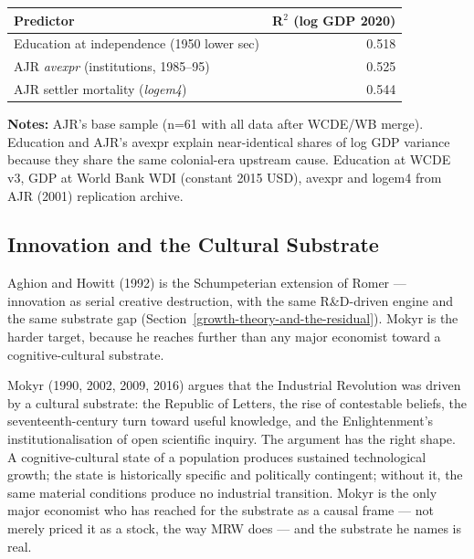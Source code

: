 \documentclass[12pt,letterpaper]{article}
\begin{document}
\begin{longtable}[]{@{}lr@{}}
\toprule
Predictor & R$^2$ (log GDP 2020) \\
\midrule
\endhead
Education at independence (1950 lower sec) & 0.518 \\
AJR \emph{avexpr} (institutions, 1985--95) & 0.525 \\
AJR settler mortality (\emph{logem4}) & 0.544 \\
\bottomrule
\end{longtable}\addtocounter{table}{-1}%

\begin{minipage}{\dimexpr\textwidth-2em}
\scriptsize
\textbf{Notes:} AJR's base sample (n=61 with all data after
WCDE/WB merge). Education and AJR's avexpr explain near-identical
shares of log GDP variance because they share the same colonial-era
upstream cause. Education at WCDE v3, GDP at World Bank WDI (constant
2015 USD), avexpr and logem4 from AJR (2001) replication archive.
\end{minipage}

\subsection{Innovation and the Cultural Substrate}\label{innovation-and-the-cultural-substrate}

Aghion and Howitt (1992) is the Schumpeterian extension of Romer --- innovation as serial creative destruction, with the same R\&D-driven engine and the same substrate gap (Section~\ref{growth-theory-and-the-residual}). Mokyr is the harder target, because he reaches further than any major economist toward a cognitive-cultural substrate.

Mokyr (1990, 2002, 2009, 2016) argues that the Industrial Revolution was driven by a cultural substrate: the Republic of Letters, the rise of contestable beliefs, the seventeenth-century turn toward useful knowledge, and the Enlightenment's institutionalisation of open scientific inquiry. The argument has the right shape. A cognitive-cultural state of a population produces sustained technological growth; the state is historically specific and politically contingent; without it, the same material conditions produce no industrial transition. Mokyr is the only major economist who has reached for the substrate as a causal frame --- not merely priced it as a stock, the way MRW does --- and the substrate he names is real.
\end{document}
